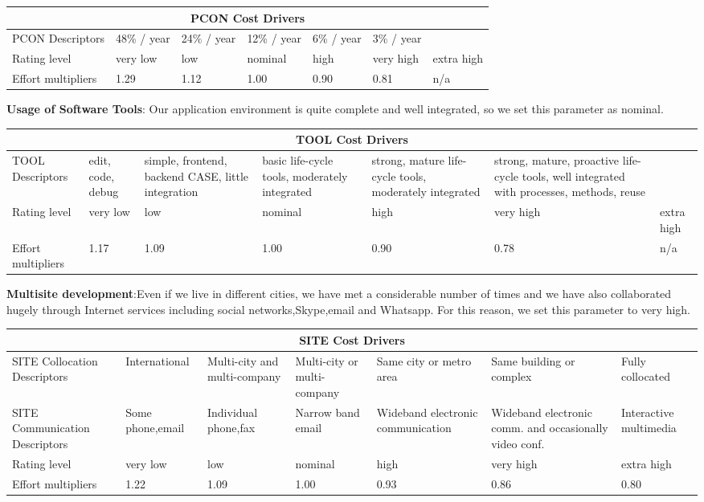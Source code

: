 \begin{itemize}
\begin{longtable}{| m{}| m{} | m{} | m{} | m{} | m{} | m{}| }
\hline
\multicolumn{7}{c}{PCON Cost Drivers}\\
\hline
\hline
PCON Descriptors & 48\% / year & 24\% / year & 12\% / year & 6\% / year & 3\% / year & \\
\hline
Rating level & very low & low & nominal & high & very high & extra high \\
\hline
Effort multipliers & 1.29 & 1.12 & 1.00 & 0.90 & 0.81 & n/a \\
\hline
\end{longtable}

\textbf{Usage of Software Tools}: Our application environment is quite complete and well integrated, so
we set this parameter as nominal.

\begin{longtable}{| m{}| m{} | m{} | m{} | m{} | m{} | m{}| }
\hline
\multicolumn{7}{c}{TOOL Cost Drivers}\\
\hline
\hline
TOOL Descriptors & edit, code, debug & simple, frontend, backend CASE, little integration & basic life-cycle tools, moderately integrated & strong, mature life-cycle tools, moderately integrated & strong, mature, proactive life-cycle tools, well integrated with processes, methods, reuse
& \\
\hline
Rating level & very low & low & nominal & high & very high & extra high \\
\hline
Effort multipliers & 1.17 & 1.09 & 1.00 & 0.90 & 0.78 & n/a \\
\hline
\end{longtable}

\textbf{Multisite development}:Even if we live in different cities, we have met a considerable number of times and we have also collaborated hugely through Internet services including social networks,Skype,email
and Whatsapp. For this reason, we  set this parameter to very high.

\begin{longtable}{| m{}| m{} | m{} | m{} | m{} | m{} | m{}| }
\hline
\multicolumn{7}{c}{SITE Cost Drivers}\\
\hline
\hline
SITE Collocation Descriptors & International & Multi-city and multi-company & Multi-city or multi-company & Same city or metro area & Same building or complex  & Fully collocated \\
\hline
SITE Communication Descriptors & Some phone,email & Individual phone,fax & Narrow band email & Wideband electronic communication &  Wideband electronic comm. and occasionally video conf. & Interactive multimedia  \\ 
Rating level & very low & low & nominal & high & very high & extra high \\
\hline
Effort multipliers & 1.22 & 1.09 & 1.00 & 0.93 & 0.86 & 0.80 \\
\hline
\end{longtable}


\end{itemize}
